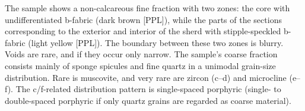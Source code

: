 \documentclass[a4paper]{article}
\begin{document}
\begin{multicols}{2}
\noindent The sample shows a non-calcareous fine fraction with two zones: the core with undifferentiated b-fabric (dark brown [PPL]), while the parts of the sections corresponding to the exterior and interior of the sherd with stipple-speckled b-fabric (light yellow [PPL]). The boundary between these two zones is blurry. Voids are rare, and if they occur only narrow. The sample's coarse fraction consists mainly of sponge spicules and fine quartz in a unimodal grain-size distribution. Rare is muscovite, and very rare are zircon (c--d) and microcline (e--f). The c/f-related distribution pattern is single-spaced porphyric (single- to double-spaced porphyric if only quartz grains are regarded as coarse material).
\end{multicols}
\end{document}
